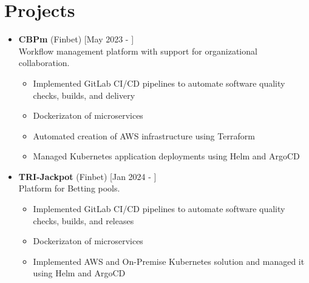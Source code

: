 \documentclass[a4paper]{moderncv}
\begin{document}
\section{Projects}	

		\begin{itemize}
			\item \textbf{CBPm} (Finbet) \hfill[May 2023 - ]\\
			Workflow management platform with support for organizational collaboration. \\
			\begin{itemize}
				\vspace{-1.5em}
				\setlength\itemsep{0.1em}
				\item Implemented GitLab CI/CD pipelines to automate software quality checks, builds, and delivery
				\item Dockerizaton of microservices
				\item Automated creation of AWS infrastructure using Terraform
				\item Managed Kubernetes application deployments using Helm and ArgoCD
			\end{itemize}
			
			\item \textbf{TRI-Jackpot} (Finbet) \hfill[Jan 2024 - ]\\
			Platform for Betting pools. \\
			\begin{itemize}
				\vspace{-1.5em}
				\setlength\itemsep{0.1em}
				\item Implemented GitLab CI/CD pipelines to automate software quality checks, builds, and releases
				\item Dockerizaton of microservices
				\item Implemented AWS and On-Premise Kubernetes solution and managed it using Helm and ArgoCD
			\end{itemize}

			

\end{itemize}
\end{document}
